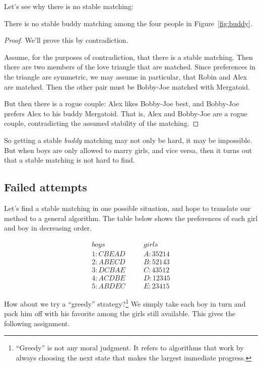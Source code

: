 Let's see why there is no stable matching: 
\begin{lemma*}
There is no stable buddy matching among the four people in
Figure~\ref{fig:buddy}.
\end{lemma*}
 
\begin{proof}
We'll prove this by contradiction.

Assume, for the purposes of contradiction, that there is a stable
matching.  Then there are two members of the love triangle that are
matched.  Since preferences in the triangle are symmetric, we may assume
in particular, that Robin and Alex are matched.  Then the other pair must
be Bobby-Joe matched with Mergatoid.

But then there is a rogue couple: Alex likes Bobby-Joe best, and Bobby-Joe
prefers Alex to his buddy Mergatoid.  That is, Alex and Bobby-Joe are a
rogue couple, contradicting the assumed stability of the matching.
\end{proof}

So getting a stable \emph{buddy} matching may not only be hard, it may be
impossible.  But when boys are only allowed to marry girls, and vice
versa, then it turns out that a stable matching is not hard to find.


\iffalse

\subsection{Failed attempts}

Let's find a stable matching in one possible situation, and hope to
translate our method to a general algorithm.  The table below shows the
preferences of each girl and boy in decreasing order.

\begin{eqnarray*}
boys & \quad & girls \\
1 : C B E A D & \quad & A : 3 5 2 1 4 \\
2 : A B E C D & \quad & B : 5 2 1 4 3 \\
3 : D C B A E & \quad & C : 4 3 5 1 2 \\
4 : A C D B E & \quad & D : 1 2 3 4 5 \\
5 : A B D E C & \quad & E : 2 3 4 1 5
\end{eqnarray*}

How about we try a ``greedy'' strategy?\footnote{``Greedy'' is not any
moral judgment.  It refers to algorithms that work by always choosing the
next state that makes the largest immediate progress.}  We simply take
each boy in turn and pack him off with his favorite among the girls still
available.  This gives the following assignment.

